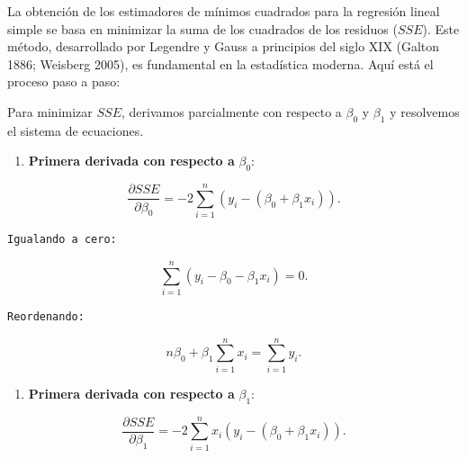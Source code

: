 \documentclass[
  letterpaper,
  DIV=11,
  numbers=noendperiod]{scrreprt}
\providecommand{\tightlist}{%
  \setlength{\itemsep}{0pt}\setlength{\parskip}{0pt}}
\begin{document}
\begin{tcolorbox}[enhanced jigsaw, leftrule=.75mm, breakable, colbacktitle=quarto-callout-note-color!10!white, bottomrule=.15mm, colframe=quarto-callout-note-color-frame, toprule=.15mm, colback=white, coltitle=black, bottomtitle=1mm, left=2mm, title=\textcolor{quarto-callout-note-color}{\faInfo}\hspace{0.5em}{Minimización de SSE}, opacityback=0, arc=.35mm, opacitybacktitle=0.6, toptitle=1mm, titlerule=0mm, rightrule=.15mm]

La obtención de los estimadores de mínimos cuadrados para la regresión
lineal simple se basa en minimizar la suma de los cuadrados de los
residuos (\(SSE\)). Este método, desarrollado por Legendre y Gauss a
principios del siglo XIX (Galton 1886; Weisberg 2005), es fundamental en
la estadística moderna. Aquí está el proceso paso a paso:

Para minimizar \(SSE\), derivamos parcialmente con respecto a
\(\beta_0\) y \(\beta_1\) y resolvemos el sistema de ecuaciones.

\begin{enumerate}
\def\labelenumi{\arabic{enumi}.}
\tightlist
\item
  \textbf{Primera derivada con respecto a} \(\beta_0\):
\end{enumerate}

\[
    \frac{\partial SSE}{\partial \beta_0} = -2\sum_{i=1}^n
    \left(y_i - (\beta_0 + \beta_1 x_i)\right).
  \]

\begin{verbatim}
Igualando a cero: 
\end{verbatim}

\[ 
    \sum_{i=1}^n \left(y_i - \beta_0 - \beta_1
    x_i\right) = 0. 
  \]

\begin{verbatim}
Reordenando: 
\end{verbatim}

\[
    n\beta_0 + \beta_1 \sum_{i=1}^n x_i = \sum_{i=1}^n y_i. \tag{1}
  \]

\begin{enumerate}
\def\labelenumi{\arabic{enumi}.}
\setcounter{enumi}{1}
\tightlist
\item
  \textbf{Primera derivada con respecto a} \(\beta_1\):
\end{enumerate}

\[
    \frac{\partial SSE}{\partial \beta_1} = -2\sum_{i=1}^n x_i
    \left(y_i - (\beta_0 + \beta_1 x_i)\right).
    \]


\end{tcolorbox}
\end{document}
